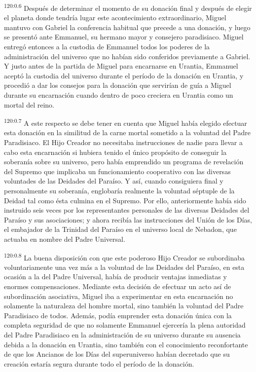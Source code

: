 \par 
\textsuperscript{120:0.6} Después de determinar el momento de su donación final y después de elegir el planeta donde tendría lugar este acontecimiento extraordinario, Miguel mantuvo con Gabriel la conferencia habitual que precede a una donación, y luego se presentó ante Emmanuel, su hermano mayor y consejero paradisiaco. Miguel entregó entonces a la custodia de Emmanuel todos los poderes de la administración del universo que no habían sido conferidos previamente a Gabriel. Y justo antes de la partida de Miguel para encarnarse en Urantia, Emmanuel aceptó la custodia del universo durante el período de la donación en Urantia, y procedió a dar los consejos para la donación que servirían de guía a Miguel durante su encarnación cuando dentro de poco creciera en Urantia como un mortal del reino.

\par 
\textsuperscript{120:0.7} A este respecto se debe tener en cuenta que Miguel había elegido efectuar esta donación en la similitud de la carne mortal sometido a la voluntad del Padre Paradisiaco. El Hijo Creador no necesitaba instrucciones de nadie para llevar a cabo esta encarnación si hubiera tenido el único propósito de conseguir la soberanía sobre su universo, pero había emprendido un programa de revelación del Supremo que implicaba un funcionamiento cooperativo con las diversas voluntades de las Deidades del Paraíso. Y así, cuando consiguiera final y personalmente su soberanía, englobaría realmente la voluntad séptuple de la Deidad tal como ésta culmina en el Supremo. Por ello, anteriormente había sido instruido seis veces por los representantes personales de las diversas Deidades del Paraíso y sus asociaciones; y ahora recibía las instrucciones del Unión de los Días, el embajador de la Trinidad del Paraíso en el universo local de Nebadon, que actuaba en nombre del Padre Universal.

\par 
\textsuperscript{120:0.8} La buena disposición con que este poderoso Hijo Creador se subordinaba voluntariamente una vez más a la voluntad de las Deidades del Paraíso, en esta ocasión a la del Padre Universal, había de producir ventajas inmediatas y enormes compensaciones. Mediante esta decisión de efectuar un acto así de subordinación asociativa, Miguel iba a experimentar en esta encarnación no solamente la naturaleza del hombre mortal, sino también la voluntad del Padre Paradisiaco de todos. Además, podía emprender esta donación única con la completa seguridad de que no solamente Emmanuel ejercería la plena autoridad del Padre Paradisiaco en la administración de su universo durante su ausencia debida a la donación en Urantia, sino también con el conocimiento reconfortante de que los Ancianos de los Días del superuniverso habían decretado que su creación estaría segura durante todo el período de la donación.

